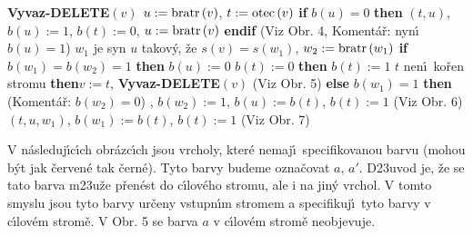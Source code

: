 {\bf Vyvaz-DELETE$\left(v\right)$\newline 
$u:=\operatorname{bratr}\left(v\right)$}, $t:=\operatorname{otec}\left(v\right)$\newline 
{\bf if} $b\left(u\right)=0$ {\bf then}\newline 
\phantom{---}{\bf Rotace}$\left(t,u\right)$, $b\left(u\right):=1$, $b\left(t\right):=0$, $u:=\operatorname{bratr}\left(v\right)$\newline 
{\bf endif\newline}
(Viz Obr. 4, Koment\'a\v r: nyn\'\i\ $b\left(u\right)=1$)\newline 
$w_1$ je syn $u$ takov\'y, \v ze $s\left(v\right)=s\left(w_1\right)$, $w_2:=\operatorname{bratr}\left(w_1\right)$\newline 
{\bf if} $b\left(w_1\right)=b\left(w_2\right)=1$ {\bf then}\newline 
\phantom{---}$b\left(u\right):=0$\newline 
\phantom{---}{\bf if} $b\left(t\right):=0$ {\bf then}\newline 
\phantom{------}$b\left(t\right):=1$\newline 
\phantom{---}{\bf else}\newline 
\phantom{------}{\bf if} $t$ nen\'\i\ ko\v ren stromu {\bf then}\newline \phantom{---------}$v:=t$, {\bf Vyvaz-DELETE}$\left(v\right)$\newline 
\phantom{------}{\bf endif}\newline 
\phantom{---}{\bf endif} (Viz Obr. 5)\newline 
{\bf else}\newline 
\phantom{---}{\bf if} $b\left(w_1\right)=1$ {\bf then}\newline 
(Koment\'a\v r: $b\left(w_2\right)=0$)\newline 
\phantom{------}{\bf Rotace$\left(t,u\right)$}, $b\left(w_2\right):=1$, $b\left(u\right):=b\left(t\right)$, $b\left(t\right):=1$ (Viz Obr. 6)\newline 
\phantom{---}{\bf else}\newline 
\phantom{------}{\bf Dvojita-rotace}$\left(t,u,w_1\right)$, $b\left(w_1\right):=b\left(t\right)$, $b\left(t\right):=1$ (Viz Obr. 7)\newline
\phantom{---}{\bf endif\newline 
endif}
\bigskip

\flushpar V n\'asleduj\'\i c\'\i ch obr\'azc\'\i ch jsou vrcholy, kter\'e 
nemaj\'\i\ specifikovanou barvu (mohou b\'yt jak \v cerven\'e tak \v cern\'e).
Tyto barvy budeme ozna\v covat $a$, $a'$. D\accent23uvod je, \v ze se 
tato barva m\accent23u\v ze p\v ren\'est do c\'\i lov\'eho stromu, ale 
i na jin\'y vrchol. V tomto smyslu jsou tyto barvy ur\v ceny vstupn\'\i m 
stromem a specifikuj\'\i\ tyto barvy v c\'\i lov\'em strom\v e. V Obr. 5 
se barva $a$ v c\'\i lov\'em strom\v e neobjevuje.
\medskip


